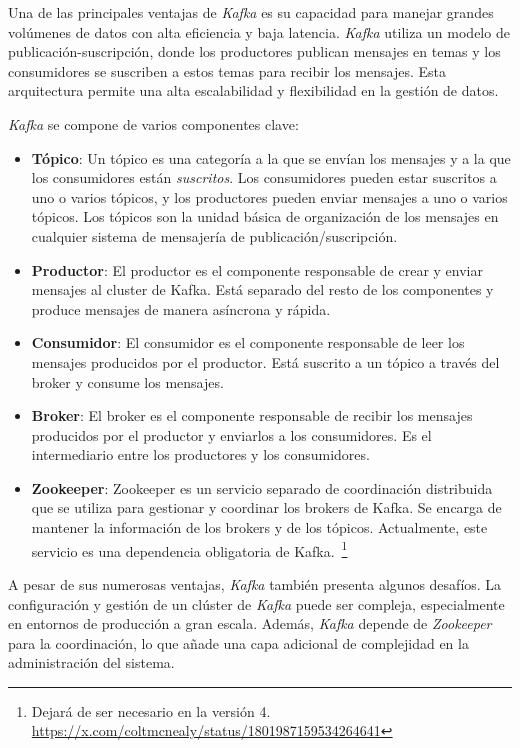 Una de las principales ventajas de \textit{Kafka} es su capacidad para manejar
grandes volúmenes de datos con alta eficiencia y baja latencia. \textit{Kafka}
utiliza un modelo de publicación-suscripción, donde los productores publican
mensajes en temas y los consumidores se suscriben a estos temas para recibir
los mensajes. Esta arquitectura permite una alta escalabilidad y flexibilidad
en la gestión de datos.

\textit{Kafka} se compone de varios componentes clave:

\begin{itemize}
    \item \textbf{Tópico}: Un tópico es una categoría a la que se envían los
		mensajes y a la que los consumidores están \textit{suscritos}. Los
		consumidores pueden estar suscritos a uno o varios tópicos, y los
		productores pueden enviar mensajes a uno o varios tópicos. Los tópicos
		son la unidad básica de organización de los mensajes en cualquier
		sistema de mensajería de publicación/suscripción.
    \item \textbf{Productor}: El productor es el componente responsable de crear
		y enviar mensajes al cluster de Kafka. Está separado del resto de los
		componentes y produce mensajes de manera asíncrona y rápida.
    \item \textbf{Consumidor}: El consumidor es el componente responsable de
		leer los mensajes producidos por el productor. Está suscrito a un tópico
		a través del broker y consume los mensajes.
    \item \textbf{Broker}: El broker es el componente responsable de recibir los
		mensajes producidos por el productor y enviarlos a los consumidores. Es
		el intermediario entre los productores y los consumidores.
    \item \textbf{Zookeeper}: Zookeeper es un servicio separado de coordinación
		distribuida que se utiliza para gestionar y coordinar los brokers de
		Kafka. Se encarga de mantener la información de los brokers y de los
		tópicos. Actualmente, este servicio es una dependencia obligatoria de
		Kafka.~\footnote{
			Dejará de ser necesario en la versión 4.
			\url{https://x.com/coltmcnealy/status/1801987159534264641}
		}
\end{itemize}

A pesar de sus numerosas ventajas, \textit{Kafka} también presenta algunos
desafíos. La configuración y gestión de un clúster de \textit{Kafka} puede ser
compleja, especialmente en entornos de producción a gran escala. Además,
\textit{Kafka} depende de \textit{Zookeeper} para la coordinación, lo que añade
una capa adicional de complejidad en la administración del sistema.

